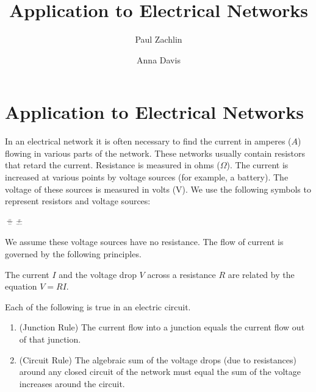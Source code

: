 \documentclass{ximera}
\author{Paul Zachlin \and Anna Davis} \title{Application to Electrical Networks} \license{CC-BY 4.0}
\begin{document}
\begin{abstract}
\end{abstract}
\maketitle

\section*{Application to Electrical Networks}
In an electrical network it is often necessary to find the current in amperes ($A$) flowing in various parts of the network. These networks usually contain resistors that retard the current. Resistance is measured in ohms ($\Omega$). The current is increased at various points by voltage sources (for example, a battery). The voltage of these sources is measured in volts (V). We use the following symbols to represent resistors and voltage sources:
\begin{image}
   \includegraphics[height=0.1in]{circuit.jpg}~
 \end{image}

We assume these voltage sources have no resistance. The flow of current is governed by the following principles.

\begin{theorem}\label{001806}

The current $I$ and the voltage drop $V$ across a resistance $R$ are related by the equation $V = RI$.

\end{theorem}

\begin{theorem}\label{001809}
    Each of the following is true in an electric circuit.
\begin{enumerate}
    \item\label{item:001809j}(Junction Rule) The current flow into a junction equals the current flow out of that junction.
    \item\label{item:001809c}(Circuit Rule) The algebraic sum of the voltage drops (due to resistances) around any closed circuit of the network must equal the sum of the voltage increases around the circuit.
\end{enumerate}

\end{theorem}
\end{document}
